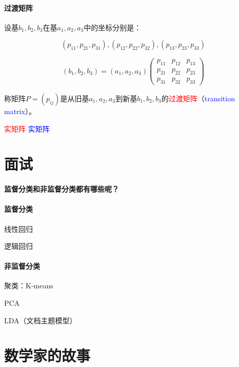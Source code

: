 \documentclass[UTF8]{ctexbook}
\begin{document}
\subsection{过渡矩阵}

设基$b_{1},b_{2},b_{3}$在基$a_{1},a_{2},a_{3}$中的坐标分别是：

\begin{displaymath}
(p_ {11},p_{21},p_{31}),(p_{12},p_{22},p_{32}),(p_{13},p_{23},p_{33})
\end{displaymath}

\begin{displaymath}
(b_{1},b_{2},b_{3})=(a_{1},a_{2},a_{3})
\begin{pmatrix} 
p_ {11} & p_{12} & p_{13} \\
p_ {21} & p_{22} & p_{23} \\
p_ {31} & p_{32} & p_{33}
\end{pmatrix}
\end{displaymath}

称矩阵$P=(p_{ij})$是从旧基$a_{1},a_{2},a_{3}$到新基$b_{1},b_{2},b_{3}$的\textcolor{red}{过渡矩阵}（\textcolor{blue}{transition matrix}）。


\textcolor{red}{实矩阵}
\textcolor{blue}{实矩阵}



\part{面试}

\subsection{监督分类和非监督分类都有哪些呢？}

\subsection{监督分类}

线性回归

逻辑回归


\subsection{非监督分类}

聚类：K-means

PCA

LDA（文档主题模型）

\part{数学家的故事}
\end{document}
